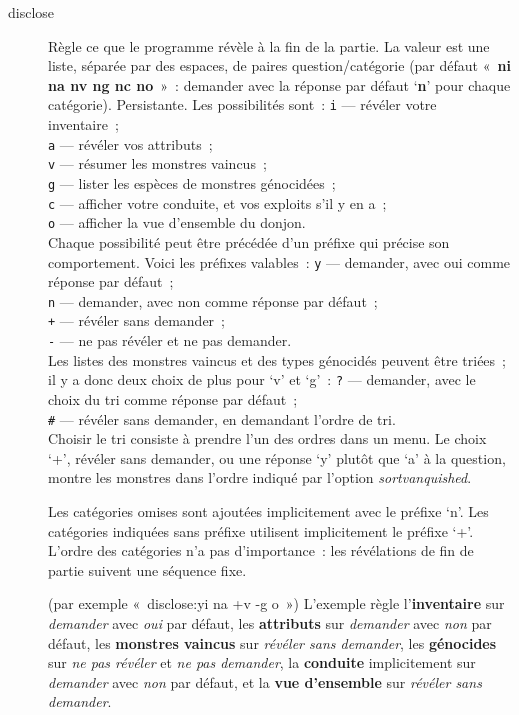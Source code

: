 \documentclass[titlepage]{article}
\begin{document}
\begin{description}
\item[{disclose}]
Règle ce que le programme révèle à la fin de la partie.
La valeur est une liste, séparée par des espaces, de paires
question/catégorie (par défaut «~\textbf{ni na nv ng nc no}~»~: demander
avec la réponse par défaut `\textbf{n}' pour chaque catégorie).
Persistante.
Les possibilités sont~:
\texttt{i} --- révéler votre inventaire~;\\
\texttt{a} --- révéler vos attributs~;\\
\texttt{v} --- résumer les monstres vaincus~;\\
\texttt{g} --- lister les espèces de monstres génocidées~;\\
\texttt{c} --- afficher votre conduite, et vos exploits s'il y en a~;\\
\texttt{o} --- afficher la vue d'ensemble du donjon.\\
Chaque possibilité peut être précédée d'un préfixe qui précise son
comportement.
Voici les préfixes valables~:
\texttt{y} --- demander, avec oui comme réponse par défaut~;\\
\texttt{n} --- demander, avec non comme réponse par défaut~;\\
\texttt{+} --- révéler sans demander~;\\
\texttt{-} --- ne pas révéler et ne pas demander.\\
Les listes des monstres vaincus et des types génocidés peuvent être
triées~; il y a donc deux choix de plus pour `v' et `g'~:
\texttt{?} --- demander, avec le choix du tri comme réponse par défaut~;\\
\texttt{\#} --- révéler sans demander, en demandant l'ordre de tri.\\
Choisir le tri consiste à prendre l'un des ordres dans un menu.
Le choix `+', révéler sans demander, ou une réponse `y' plutôt
que `a' à la question, montre les monstres dans l'ordre indiqué par
l'option
\textit{sortvanquished}.


Les catégories omises sont ajoutées implicitement avec le préfixe
`n'.
Les catégories indiquées sans préfixe utilisent implicitement le préfixe
`+'.
L'ordre des catégories n'a pas d'importance~: les révélations de fin de
partie suivent une séquence fixe.


(par exemple «~disclose:yi na +v -g o~»)
L'exemple règle l'\textbf{inventaire} sur \textit{demander} avec \textit{oui} par
défaut, les \textbf{attributs} sur \textit{demander} avec \textit{non} par défaut,
les \textbf{monstres vaincus} sur \textit{révéler sans demander}, les
\textbf{génocides} sur \textit{ne pas révéler} et \textit{ne pas demander}, la
\textbf{conduite} implicitement sur \textit{demander} avec \textit{non} par défaut,
et la \textbf{vue d'ensemble} sur \textit{révéler sans demander}.



\end{description}
\end{document}
